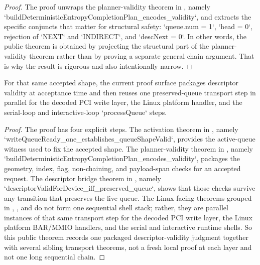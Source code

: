 \begin{proof}
\leanok
{}
The proof unwraps the planner-validity theorem in , namely `buildDeterministicEntropyCompletionPlan_encodes_validity`, and extracts the specific conjuncts that matter for structural safety: `queue.num = 1`, `head = 0`, rejection of `NEXT` and `INDIRECT`, and `descNext = 0`.
In other words, the public theorem is obtained by projecting the structural part of the planner-validity theorem rather than by proving a separate general chain argument.
That is why the result is rigorous and also intentionally narrow.
\end{proof}

\begin{theorem}
\label{thm:descriptor-validity}
\leanok
For that same accepted shape, the current proof surface packages descriptor validity at acceptance time and then reuses one preserved-queue transport step in parallel for the decoded PCI write layer, the Linux platform handler, and the serial-loop and interactive-loop `processQueue` steps.
\end{theorem}

\begin{proof}
\leanok
{}
The proof has four explicit steps.
The activation theorem in , namely `writeQueueReady_one_establishes_queueShapeValid`, provides the active-queue witness used to fix the accepted shape.
The planner-validity theorem in , namely `buildDeterministicEntropyCompletionPlan_encodes_validity`, packages the geometry, index, flag, non-chaining, and payload-span checks for an accepted request.
The descriptor bridge theorem in , namely `descriptorValidForDevice_iff_preserved_queue`, shows that those checks survive any transition that preserves the live queue.
The Linux-facing theorems grouped in , , and  do not form one sequential shell stack; rather, they are parallel instances of that same transport step for the decoded PCI write layer, the Linux platform BAR/MMIO handlers, and the serial and interactive runtime shells.
So this public theorem records one packaged descriptor-validity judgment together with several sibling transport theorems, not a fresh local proof at each layer and not one long sequential chain.
\end{proof}

